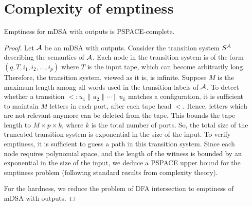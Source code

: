 \section{Complexity of emptiness}

\begin{theorem}
Emptiness for mDSA with outputs is PSPACE-complete.
\end{theorem}
\begin{proof}
    Let $\mathcal{A}$ be an mDSA with outputs. Consider the transition system $S^{\mathcal{A}}$ describing the semantics of $\mathcal{A}$. Each node in the transition system is of the form $(q, T, i_1, i_2, \dots, i_p)$ where $T$ is the input tape, which can become arbitrarily long. Therefore, the transition system, viewed as it is, is infinite. Suppose $M$ is the maximum length among all words used in the transition labels of $\mathcal{A}$. To detect whether a transition $\lt: u_1 \parallel u_2 \parallel \cdots \parallel u_k$ matches a configuration, it is sufficient to maintain $M$ letters in each port, after each tape head $\lt$. Hence, letters which are not relevant anymore can be deleted from the tape. This bounds the tape length to $M \times p \times k$, where $k$ is the total number of ports. So, the total size of the truncated transition system is exponential in the size of the input. To verify emptiness, it is sufficient to guess a path in this transition system. Since each node requires polynomial space, and the length of the witness is bounded by an exponential in the size of the input, we deduce a PSPACE upper bound for the emptiness problem (following standard results from complexity theory).

    For the hardness, we reduce the problem of DFA intersection to emptiness of mDSA with outputs. 
\end{proof}